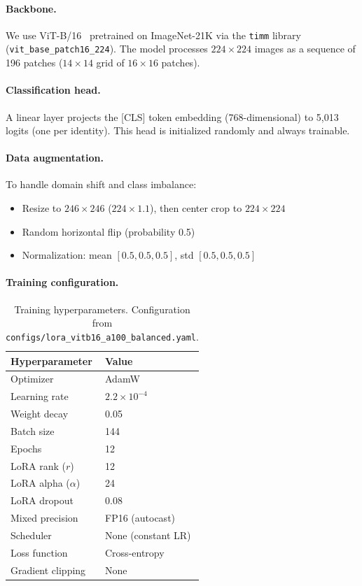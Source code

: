 \documentclass[11pt]{article}
\begin{document}
\paragraph{Backbone.}
We use ViT-B/16~\cite{dosovitskiy2021vit} pretrained on ImageNet-21K via the \texttt{timm} library (\texttt{vit\_base\_patch16\_224}). The model processes $224 \times 224$ images as a sequence of 196 patches ($14 \times 14$ grid of $16 \times 16$ patches).

\paragraph{Classification head.}
A linear layer projects the [CLS] token embedding (768-dimensional) to 5,013 logits (one per identity). This head is initialized randomly and always trainable.

\paragraph{Data augmentation.}
To handle domain shift and class imbalance:
\begin{itemize}
    \item Resize to $246 \times 246$ ($224 \times 1.1$), then center crop to $224 \times 224$
    \item Random horizontal flip (probability 0.5)
    \item Normalization: mean $[0.5, 0.5, 0.5]$, std $[0.5, 0.5, 0.5]$
\end{itemize}

\paragraph{Training configuration.}
\begin{table}[H]
\centering
\small
\begin{tabular}{ll}
\toprule
\textbf{Hyperparameter} & \textbf{Value} \\
\midrule
Optimizer & AdamW \\
Learning rate & $2.2 \times 10^{-4}$ \\
Weight decay & 0.05 \\
Batch size & 144 \\
Epochs & 12 \\
LoRA rank ($r$) & 12 \\
LoRA alpha ($\alpha$) & 24 \\
LoRA dropout & 0.08 \\
Mixed precision & FP16 (autocast) \\
Scheduler & None (constant LR) \\
Loss function & Cross-entropy \\
Gradient clipping & None \\
\bottomrule
\end{tabular}
\caption{Training hyperparameters. Configuration from \texttt{configs/lora\_vitb16\_a100\_balanced.yaml}.}
\label{tab:hyperparams}
\end{table}
\end{document}
